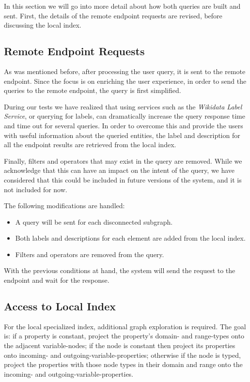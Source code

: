 In this section we will go into more detail about how both queries are built and sent. First, the details of the remote endpoint requests are revised, before discussing the local index.

\subsection{Remote Endpoint Requests}

As was mentioned before, after processing the user query, it is sent to the remote endpoint. Since the focus is on enriching the user experience, in order to send the queries to the remote endpoint, the query is first simplified.

During our tests we have realized that using services such as the \textit{Wikidata Label Service}, or querying for labels, can dramatically increase the query response time and time out for several queries. In order to overcome this and provide the users with useful information about the queried entities, the label and description for all the endpoint results are retrieved from the local index.

Finally, filters and operators that may exist in the query are removed. While we acknowledge that this can have an impact on the intent of the query, we have considered that this could be included in future versions of the system, and it is not included for now.

The following modifications are handled:
\begin{itemize}
    \item A query will be sent for each disconnected subgraph.
    \item Both labels and descriptions for each element are added from the local index.
    \item Filters and operators are removed from the query.
\end{itemize}

With the previous conditions at hand, the system will send the request to the endpoint and wait for the response.

\subsection{Access to Local Index}

For the local specialized index, additional graph exploration is required. The goal is: if a property is constant, project the property's domain- and range-types onto the adjacent variable-nodes; if the node is constant then project its properties onto incoming- and outgoing-variable-properties; otherwise if the node is typed, project the properties with those node types in their domain and range onto the incoming- and outgoing-variable-properties.


